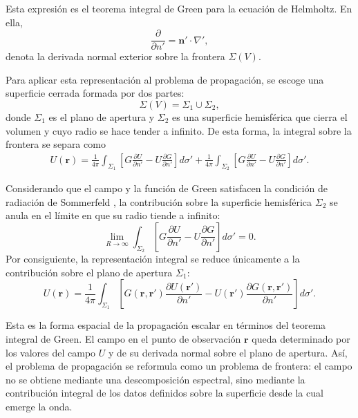 \documentclass[12pt,a4paper]{article}
\numberwithin{equation}{section}
\begin{document}
Esta expresión es el teorema integral de Green para la ecuación de Helmholtz. En ella,
\begin{equation}
\frac{\partial}{\partial n'}
=
\mathbf n'\cdot\nabla',
\end{equation}
denota la derivada normal exterior sobre la frontera \(\Sigma(V)\).

Para aplicar esta representación al problema de propagación, se escoge una superficie cerrada formada por dos partes:
\begin{equation}
\Sigma(V)=\Sigma_1\cup\Sigma_2,
\end{equation}
donde \(\Sigma_1\) es el plano de apertura y \(\Sigma_2\) es una superficie hemisférica que cierra el volumen y cuyo radio se hace tender a infinito. De esta forma, la integral sobre la frontera se separa como
\begin{equation}
\begin{aligned}
U(\mathbf r)
=
\frac{1}{4\pi}
\int_{\Sigma_1}
\left[
G\frac{\partial U}{\partial n'}
-
U\frac{\partial G}{\partial n'}
\right]
d\sigma'
+
\frac{1}{4\pi}
\int_{\Sigma_2}
\left[
G\frac{\partial U}{\partial n'}
-
U\frac{\partial G}{\partial n'}
\right]
d\sigma'.
\end{aligned}
\label{eq:Green_integral_split_boundary}
\end{equation}

Considerando que el campo y la función de Green satisfacen la condición de radiación de Sommerfeld \cite{jackson1999}, la contribución sobre la superficie hemisférica \(\Sigma_2\) se anula en el límite en que su radio tiende a infinito:
\begin{equation}
\lim_{R\to\infty}
\int_{\Sigma_2}
\left[
G\frac{\partial U}{\partial n'}
-
U\frac{\partial G}{\partial n'}
\right]
d\sigma'
=
0.
\label{eq:Sommerfeld_condition_boundary_vanishes}
\end{equation}
Por consiguiente, la representación integral se reduce únicamente a la contribución sobre el plano de apertura \(\Sigma_1\):
\begin{equation}
U(\mathbf r)
=
\frac{1}{4\pi}
\int_{\Sigma_1}
\left[
G(\mathbf r,\mathbf r')
\frac{\partial U(\mathbf r')}{\partial n'}
-
U(\mathbf r')
\frac{\partial G(\mathbf r,\mathbf r')}{\partial n'}
\right]
d\sigma'.
\label{eq:Green_integral_aperture_plane}
\end{equation}

Esta es la forma espacial de la propagación escalar en términos del teorema integral de Green. El campo en el punto de observación \(\mathbf r\) queda determinado por los valores del campo \(U\) y de su derivada normal sobre el plano de apertura. Así, el problema de propagación se reformula como un problema de frontera: el campo no se obtiene mediante una descomposición espectral, sino mediante la contribución integral de los datos definidos sobre la superficie desde la cual emerge la onda.
\end{document}

